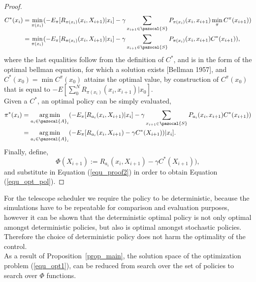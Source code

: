\documentclass[11pt]{article}
\theoremstyle{definition}
\DeclareMathOperator*{\argmin}{arg\,min}
\begin{document}
\begin{proof}
\begin{equation*}
\begin{aligned}
C^{*}(x_{{i}}) &= \min_{\pi(x_{i})} (- E_{\pi}[R_{\pi(x_i)}(x_{i}, X_{{i+1}}) | x_{i}] -\gamma \sum_{x_{i+1} \in \pazocal{S}} P_{\pi(x_i)}(x_{i},x_{i+1}) \min_{\pi} C^{\pi}({x_{{i+1}}}))\\
&= \min_{\pi(x_{i})} (- E_{\pi}[R_{\pi(x_i)}(x_{i}, X_{{i+1}}) | x_{i}] -\gamma \sum_{x_{i+1} \in \pazocal{S}} P_{\pi(x_i)}(x_{i},x_{i+1}) C^*({x_{{i+1}}})),\\
\end{aligned}
\end{equation*}
where the last equalities follow from the definition of $C^*$, and is in the form of the optimal bellman equation, for which a solution exists [Bellman 1957], and $C^*(x_0) = \min{C^\pi(x_0)}$ attains the optimal value, by construction of $C^\pi(x_0)$ that is equal to $- E[\sum_{0}^N R_{\pi(x_i)}(x_{{i}}, x_{i+1}) | x_0]$.\\
Given a $C^*$, an optimal policy can be simply evaluated,
\begin{equation}\label{equ_proof2}
\begin{aligned}
\pi^*(x_{i}) & = \argmin_{a_{i} \in \pazocal{A}_i} (- E_{\pi}[R_{a_i}(x_{{i}}, X_{i+1}) | x_{i}] -\gamma \sum_{x_{i+1} \in \pazocal{S}} P_{a_i}(x_{i},x_{i+1})C^*({x_{{i+1}}}))\\
& = \argmin_{a_{i} \in \pazocal{A}_i} (- E_{\pi}[R_{a_i}(x_{{i}}, X_{i+1}) - \gamma C^*({X_{{i+1}}}))| x_{i}].\\
\end{aligned}
\end{equation}
Finally, define,
\begin{equation}\label{equ_phi}
\Phi(X_{{i+1}}) := R_{a_i}(x_{{i}}, X_{i+1}) - \gamma C^*({X_{{i+1}}})),
\end{equation}
 and substitute in Equation (\ref{equ_proof2}) in order to obtain Equation (\ref{equ_opt_pol}).
\end{proof}
For the telescope scheduler we require the policy to be deterministic, because the simulations have to be repeatable for comparison and evaluation purposes, however it can be shown that the deterministic optimal policy is not only optimal amongst deterministic policies, but also is optimal amongst stochastic policies. Therefore the choice of deterministic policy does not harm the optimality of the control. \\
As a result of Proposition~\ref{prop_main}, the solution space of the optimization problem (\ref{equ_opt1}), can be reduced from search over the set of policies to search over $\Phi$ functions.
\end{document}
